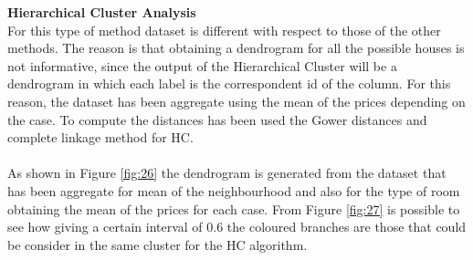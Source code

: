 \documentclass{FR16}
\begin{document}
\newpage
\noindent \textbf{Hierarchical Cluster Analysis}\\
For this type of method dataset is different with respect to those of the other methods. The reason is that obtaining a dendrogram  for all the possible houses is not informative, since the output of the Hierarchical Cluster will be a dendrogram  in which each label is the correspondent id of the column. For this reason, the dataset has been aggregate using the mean of the prices depending on the case. To compute the distances has been used the Gower distances and complete linkage method for HC.
\\\\
\noindent  As shown in Figure \ref{fig:26} the dendrogram  is generated from the dataset that has been aggregate for mean of the neighbourhood and also for the type of room obtaining the mean of the prices for each case. From Figure \ref{fig:27} is possible to see how giving a certain interval of 0.6 the coloured branches are those that could be consider in the same cluster for the HC algorithm. 
\end{document}
